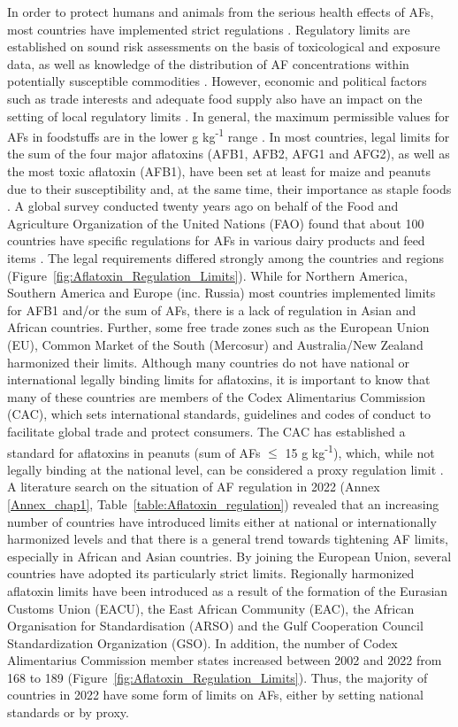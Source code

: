In order to protect humans and animals from the serious health effects of AFs, most countries have implemented strict regulations \citep{van2004worldwide}. Regulatory limits are established on sound risk assessments on the basis of toxicological and exposure data, as well as knowledge of the distribution of AF concentrations within potentially susceptible commodities \citep{chilaka2022mycotoxin}. However, economic and political factors such as trade interests and adequate food supply also have an impact on the setting of local regulatory limits \citep{van2004worldwide}. In general, the maximum permissible values for AFs in foodstuffs are in the lower \textmu{}g kg\textsuperscript{-1} range \citep{van2004worldwide, sirma2018impacts}. In most countries, legal limits for the sum of the four major aflatoxins (AFB1, AFB2, AFG1 and AFG2), as well as the most toxic aflatoxin (AFB1), have been set at least for maize and peanuts due to their susceptibility and, at the same time, their importance as staple foods \citep{wu2013global}. A global survey conducted twenty years ago on behalf of the Food and Agriculture Organization of the United Nations (FAO) found that about 100 countries have specific regulations for AFs in various dairy products and feed items \citep{van2004worldwide}. The legal requirements differed strongly among the countries and regions (Figure~\ref{fig:Aflatoxin_Regulation_Limits}). While for Northern America, Southern America and Europe (inc. Russia) most countries implemented limits for AFB1 and/or the sum of AFs, there is a lack of regulation in Asian and African countries. Further, some free trade zones such as the European Union (EU), Common Market of the South (Mercosur) and Australia/New Zealand harmonized their limits. Although many countries do not have national or international legally binding limits for aflatoxins, it is important to know that many of these countries are members of the Codex Alimentarius Commission (CAC), which sets international standards, guidelines and codes of conduct to facilitate global trade and protect consumers. The CAC has established a standard for aflatoxins in peanuts (sum of AFs $\leq$ 15 \textmu{}g kg\textsuperscript{-1}), which, while not legally binding at the national level, can be considered a proxy regulation limit \citep{CAC1995}. A literature search on the situation of AF regulation in 2022 (Annex \ref{Annex_chap1}, Table~\ref{table:Aflatoxin_regulation}) revealed that an increasing number of countries have introduced limits either at national or internationally harmonized levels and that there is a general trend towards tightening AF limits, especially in African and Asian countries. By joining the European Union, several countries have adopted its particularly strict limits. Regionally harmonized aflatoxin limits have been introduced as a result of the formation of the Eurasian Customs Union (EACU), the East African Community (EAC), the African Organisation for Standardisation (ARSO) and the  Gulf Cooperation Council Standardization Organization (GSO). In addition, the number of Codex Alimentarius Commission member states increased between 2002 and 2022 from 168 to 189 (Figure~\ref{fig:Aflatoxin_Regulation_Limits}). Thus, the majority of countries in 2022 have some form of limits on AFs, either by setting national standards or by proxy. 
